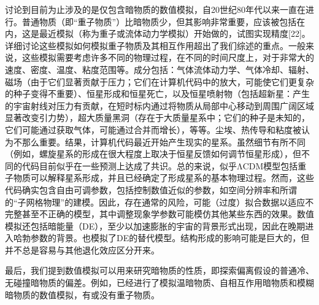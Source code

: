 讨论到目前为止涉及的是仅包含暗物质的数值模拟，自20世纪80年代以来一直在进行。普通物质（即“重子物质”）比暗物质少，但其影响非常重要，应该被包括在内，这是最近模拟（称为重子或流体动力学模拟）开始做的，试图实现精度[22]。详细讨论这些模拟如何模拟重子物质及其相互作用超出了我们综述的重点。一般来说，这些模拟需要考虑许多不同的物理过程，在不同的时间尺度上，对于非常大的速度、密度、温度、粘度范围等。成分包括：气体流体动力学、气体冷却、辐射、磁场（由于它们显著贡献于压力；它们在计算机代码中的放大，可能使它们更复杂的种子变得不重要）、恒星形成和恒星死亡，以及恒星喷射物（包括超新星：产生的宇宙射线对压力有贡献，在短时标内通过将物质从局部中心移动到周围广阔区域显著改变引力势），超大质量黑洞（存在于大质量星系中；它们的种子是未知的，它们可能通过获取气体，可能通过合并而增长），等等。尘埃、热传导和粘度被认为不那么重要。结果，计算机代码最近开始产生现实的星系。虽然细节有所不同（例如，螺旋星系的形成在很大程度上取决于恒星反馈如何调节恒星形成），但不同的代码目前似乎在一些预测上达成了共识。总的来说，似乎ΛCDM模型包括重子物质可以解释星系形成，并且已经确定了形成星系的基本物理过程。然而，这些代码确实包含自由可调参数，包括控制数值近似的参数，如空间分辨率和所谓的“子网格物理”的建模。因此，存在通常的风险，可能（过度）拟合数据以适应不完整甚至不正确的模型，其中调整现象学参数可能模仿其他某些东西的效果。数值模拟还包括暗能量（DE），至少以加速膨胀的宇宙的背景形式出现，因此在晚期进入哈勃参数的背景。也模拟了DE的替代模型。结构形成的影响可能是巨大的，但并不总是容易与其他退化效应区分开来。

最后，我们提到数值模拟可以用来研究暗物质的性质，即探索偏离假设的普通冷、无碰撞暗物质的偏差。例如，已经进行了模拟温暗物质、自相互作用暗物质和模糊暗物质的数值模拟，有或没有重子物质。
